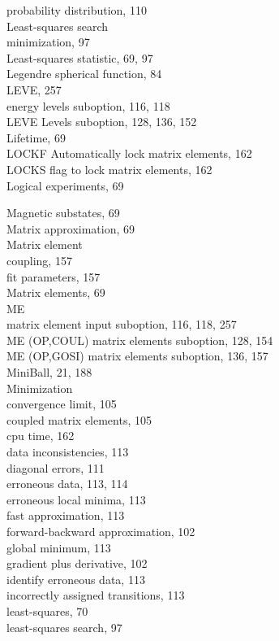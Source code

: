 \documentclass[10pt]{article}
\begin{document}
probability distribution, 110\\
Least-squares search\\
minimization, 97\\
Least-squares statistic, 69, 97\\
Legendre spherical function, 84\\
LEVE, 257\\
energy levels suboption, 116, 118\\
LEVE Levels suboption, 128, 136, 152\\
Lifetime, 69\\
LOCKF Automatically lock matrix elements, 162\\
LOCKS flag to lock matrix elements, 162\\
Logical experiments, 69

Magnetic substates, 69\\
Matrix approximation, 69\\
Matrix element\\
coupling, 157\\
fit parameters, 157\\
Matrix elements, 69\\
ME\\
matrix element input suboption, 116, 118, 257\\
ME (OP,COUL) matrix elements suboption, 128, 154\\
ME (OP,GOSI) matrix elements suboption, 136, 157\\
MiniBall, 21, 188\\
Minimization\\
convergence limit, 105\\
coupled matrix elements, 105\\
cpu time, 162\\
data inconsistencies, 113\\
diagonal errors, 111\\
erroneous data, 113, 114\\
erroneous local minima, 113\\
fast approximation, 113\\
forward-backward approximation, 102\\
global minimum, 113\\
gradient plus derivative, 102\\
identify erroneous data, 113\\
incorrectly assigned transitions, 113\\
least-squares, 70\\
least-squares search, 97\\
\end{document}
